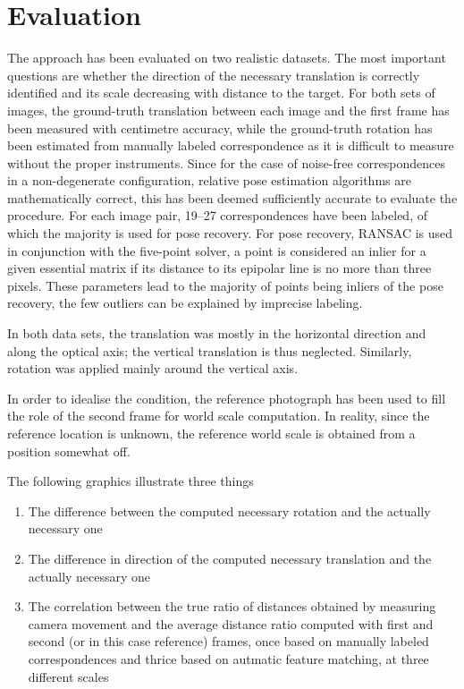 \chapter{Evaluation}

The approach has been evaluated on two realistic datasets. The most important
questions are whether the direction of the necessary translation is correctly
identified and its scale decreasing with distance to the target.
For both sets of images, the ground-truth translation between each image and the
first frame has been measured with centimetre accuracy, while the ground-truth
rotation has been estimated from manually labeled correspondence as it is
difficult to measure without the proper instruments. Since for the case of
noise-free correspondences in a non-degenerate configuration, relative pose
estimation algorithms are mathematically correct, this has been deemed
sufficiently accurate to evaluate the procedure. For each image pair, 19--27
correspondences have been labeled, of which the majority is used for pose
recovery. For pose recovery, RANSAC is used in conjunction with the five-point
solver, a point is considered an inlier for a given essential matrix if its
distance to its epipolar line is no more than three pixels. These parameters
lead to the majority of points being inliers of the pose recovery, the few
outliers can be explained by imprecise labeling.

In both data sets, the translation was mostly in the horizontal direction and
along the optical axis; the vertical translation is thus neglected. Similarly,
rotation was applied mainly around the vertical axis.

In order to idealise the condition, the reference photograph has been used to
fill the role of the second frame for world scale computation. In reality, since
the reference location is unknown, the reference world scale is obtained from a
position somewhat off.

The following graphics illustrate three things
\begin{enumerate}
   \item The difference between the computed necessary rotation and the actually
      necessary one
   \item The difference in direction of the computed necessary translation and
      the actually necessary one
   \item The correlation between the true ratio of distances obtained by
      measuring camera movement and the average distance ratio computed with first
      and second (or in this case reference) frames, once based on manually
      labeled correspondences and thrice based on autmatic feature matching, at
      three different scales
\end{enumerate}

